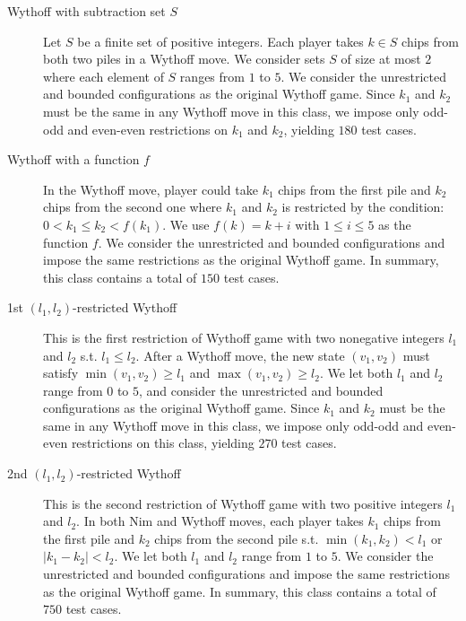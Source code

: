 \documentclass[review]{elsarticle}
\begin{document}
\begin{description}
	\item[Wythoff with subtraction set $S$]
	Let $S$ be a finite set of positive integers.
	Each player takes $k \in S$ chips from both two piles in a Wythoff move.
	We consider sets $S$ of size at most $2$ where each element of $S$ ranges from $1$ to $5$.
	We consider the unrestricted and bounded configurations as the original Wythoff game.
	Since $k_1$ and $k_2$ must be the same in any Wythoff move in this class, we impose only odd-odd and even-even restrictions on $k_1$ and $k_2$, yielding $180$ test cases.
	
	\item[Wythoff with a function $f$]
	In the Wythoff move, player could take $k_1$ chips from the first pile and $k_2$ chips from the second one where $k_1$ and $k_2$ is restricted by the condition: $0 < k_1 \leq k_2 < f(k_1)$.
	We use $f(k) = k + i$ with $1 \leq i \leq 5$ as the function $f$.
	We consider the unrestricted and bounded configurations and impose the same restrictions as the original Wythoff game.
	In summary, this class contains a total of $150$ test cases.
	
	\item[1st $(l_1, l_2)$-restricted Wythoff]
	This is the first restriction of Wythoff game with two nonegative integers $l_1$ and $l_2$ s.t. $l_1 \le l_2$.
	After a Wythoff move, the new state $(v_1, v_2)$ must satisfy $\min(v_1, v_2) \ge l_1$ and $\max(v_1, v_2) \ge l_2$.
	We let both $l_1$ and $l_2$ range from $0$ to $5$, and consider the unrestricted and bounded configurations as the original Wythoff game.
	Since $k_1$ and $k_2$ must be the same in any Wythoff move in this class, we impose only odd-odd and even-even restrictions on this class, yielding $270$ test cases.
	
	\item[2nd $(l_1, l_2)$-restricted Wythoff]
	This is the second restriction of Wythoff game with two positive integers $l_1$ and $l_2$.
	In both Nim and Wythoff moves, each player takes $k_1$ chips from the first pile and $k_2$ chips from the second pile s.t. $\min(k_1, k_2) < l_1$ or $|k_1 - k_2| < l_2$.
	We let both $l_1$ and $l_2$ range from $1$ to $5$.
	We consider the unrestricted and bounded configurations and impose the same restrictions as the original Wythoff game.
	In summary, this class contains a total of $750$ test cases.
	

\end{description}
\end{document}

